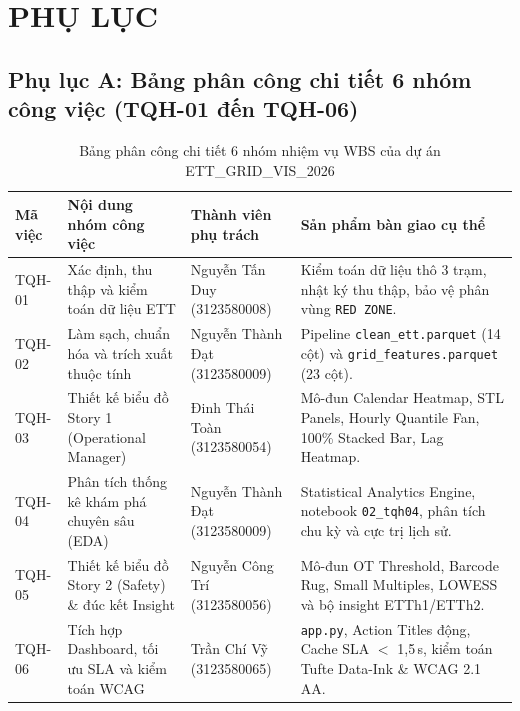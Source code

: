 \documentclass[12pt,a4paper,oneside]{report}
\newcommand{\thead}{\rowcolor{gray!20}}
\newcommand{\tablesetup}{\small\setstretch{1.05}%
  \renewcommand{\arraystretch}{1.3}\rowcolors{2}{white}{gray!6}}
\newcommand{\code}[1]{\texttt{#1}}
\begin{document}
\chapter*{PHỤ LỤC}

\section*{Phụ lục A: Bảng phân công chi tiết 6 nhóm công việc (TQH-01 đến TQH-06)}

\begin{table}[H]
\centering
\caption{Bảng phân công chi tiết 6 nhóm nhiệm vụ WBS của dự án ETT\_GRID\_VIS\_2026}
\label{tab:wbs_appendix}
\tablesetup
\begin{tabularx}{\textwidth}{|C{1.8cm}|Q{3.8cm}|Q{3.6cm}|L|}
\hline
\thead \textbf{Mã việc} & \textbf{Nội dung nhóm công việc} & \textbf{Thành viên phụ trách} & \textbf{Sản phẩm bàn giao cụ thể}\\ \hline
TQH-01 & Xác định, thu thập và kiểm toán dữ liệu ETT & Nguyễn Tấn Duy (3123580008) & Kiểm toán dữ liệu thô 3 trạm, nhật ký thu thập, bảo vệ phân vùng \code{RED ZONE}.\\ \hline
TQH-02 & Làm sạch, chuẩn hóa và trích xuất thuộc tính & Nguyễn Thành Đạt (3123580009) & Pipeline \code{clean\_ett.parquet} (14 cột) và \code{grid\_features.parquet} (23 cột).\\ \hline
TQH-03 & Thiết kế biểu đồ Story 1 (Operational Manager) & Đinh Thái Toàn (3123580054) & Mô-đun Calendar Heatmap, STL Panels, Hourly Quantile Fan, 100\% Stacked Bar, Lag Heatmap.\\ \hline
TQH-04 & Phân tích thống kê khám phá chuyên sâu (EDA) & Nguyễn Thành Đạt (3123580009) & Statistical Analytics Engine, notebook \code{02\_tqh04}, phân tích chu kỳ và cực trị lịch sử.\\ \hline
TQH-05 & Thiết kế biểu đồ Story 2 (Safety) \& đúc kết Insight & Nguyễn Công Trí (3123580056) & Mô-đun OT Threshold, Barcode Rug, Small Multiples, LOWESS và bộ insight ETTh1/ETTh2.\\ \hline
TQH-06 & Tích hợp Dashboard, tối ưu SLA và kiểm toán WCAG & Trần Chí Vỹ (3123580065) & \code{app.py}, Action Titles động, Cache SLA $<$ 1,5\,s, kiểm toán Tufte Data-Ink \& WCAG 2.1 AA.\\ \hline
\end{tabularx}
\end{table}
\end{document}
